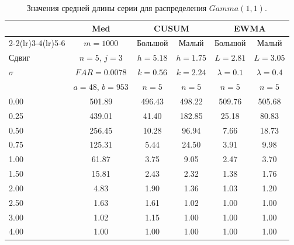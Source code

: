 \begin{table}[!ht]
	\centering
	\caption{Значения средней длины серии для распределения \(Gamma(1, 1)\).}
	\label{tab:4.20b}
	\small
	\begin{tabular}{@{}lccccc@{}}
		\toprule
		& Med & \multicolumn{2}{c}{CUSUM} & \multicolumn{2}{c}{EWMA} \\
		\cmidrule(lr){2-2}\cmidrule(lr){3-4}\cmidrule(lr){5-6}
		& \(m = 1000\) & Большой & Малый & Большой & Малый \\
		Сдвиг & \(n = 5\), \(j = 3\) & \(h = 5.18\) & \(h = 1.75\) & \(L = 2.81\) & \(L = 3.05\) \\
		\(\sigma\) & \(FAR = 0.0078\) & \(k = 0.56\) & \(k = 2.24\) & \(\lambda = 0.1\) & \(\lambda = 0.4\) \\
		& \(a = 48\), \(b = 953\) & \(n = 5\) & \(n = 5\) & \(n = 5\) & \(n = 5\) \\
		\midrule
		0.00 & 501.89 & 496.43 & 498.22 & 509.76 & 505.68 \\
		0.25 & 439.01 & 41.40 & 182.85 & 25.18 & 80.83 \\
		0.50 & 256.45 & 10.28 & 96.94 & 7.66 & 18.73 \\
		0.75 & 125.31 & 5.44 & 24.50 & 3.91 & 9.98 \\
		1.00 & 61.87 & 3.75 & 9.05 & 2.47 & 3.70 \\
		1.50 & 15.81 & 2.43 & 2.32 & 1.38 & 1.76 \\
		2.00 & 4.83 & 1.90 & 1.36 & 1.03 & 1.20 \\
		2.50 & 1.63 & 1.61 & 1.02 & 1.00 & 1.00 \\
		3.00 & 1.02 & 1.15 & 1.00 & 1.00 & 1.00 \\
		4.00 & 1.00 & 1.00 & 1.00 & 1.00 & 1.00 \\
		\bottomrule
	\end{tabular}
\end{table}

